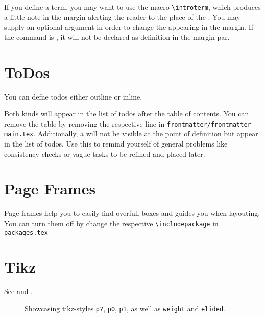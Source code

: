 If you define a term, you may want to use the macro \texttt{\textbackslash introterm}, which produces a little note in the margin alerting the reader to the place of the .
You may supply an optional argument in order to change the  appearing in the margin. If the command is , it will not be declared as definition in the margin par.

\section{ToDos}
You can defne todos either outline or inline. 

Both kinds will appear in the list of todos after the table of contents. You can remove the table by removing the respective line in \texttt{frontmatter/frontmatter-main.tex}.
Additionally, a  will not be visible at the point of definition but appear in the list of todos. Use this to remind yourself of general problems like consistency checks or vague tasks to be refined and placed later. 

\section{Page Frames}

Page frames help you to easily find overfull boxes and guides you when layouting. You can turn them off by change the respective \texttt{\textbackslash includepackage} in \texttt{packages.tex}

\section{Tikz}

See  and .

\begin{figure} \centering
{}
\caption{Showcasing tikz-styles \texttt{p?}, \texttt{p0}, \texttt{p1}, as well as \texttt{weight} and \texttt{elided}.}
\end{figure}

